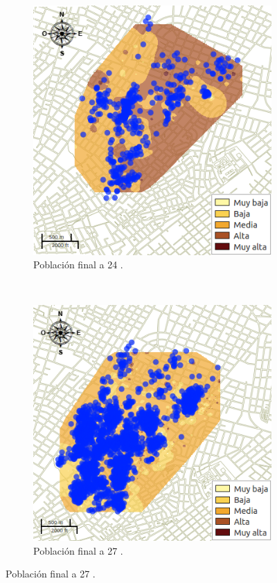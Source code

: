 \begin{figure}[!t]
    \begin{subfigure}[b]{0.225\textwidth}
        \includegraphics[width=\textwidth]{./graphics/temp-24-final.png}
        \caption{ Población final a 24 \textcelsius.}
    \end{subfigure}
    ~~~~
    \begin{subfigure}[b]{0.225\textwidth}
        \includegraphics[width=\textwidth]{../book/capitulo-6/graphics/raster/temp-27-49.png}
        \caption{ Población final a 27 \textcelsius.}
    \end{subfigure}


\end{figure}
